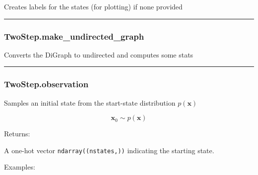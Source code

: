 \begin{Shaded}
\begin{Highlighting}[]
\NormalTok{)}
\end{Highlighting}
\end{Shaded}

Creates labels for the states (for plotting) if none provided

\begin{center}\rule{0.5\linewidth}{\linethickness}\end{center}

\subsubsection{TwoStep.make\_undirected\_graph}\label{twostep.make_undirected_graph}

\begin{Shaded}
\begin{Highlighting}[]
\NormalTok{)}
\end{Highlighting}
\end{Shaded}

Converts the DiGraph to undirected and computes some stats

\begin{center}\rule{0.5\linewidth}{\linethickness}\end{center}

\subsubsection{TwoStep.observation}\label{twostep.observation}

\begin{Shaded}
\begin{Highlighting}[]
\NormalTok{)}
\end{Highlighting}
\end{Shaded}

Samples an initial state from the start-state distribution
\(p(\mathbf x)\)

\[
\mathbf x_0 \sim p(\mathbf x)
\]

Returns:

A one-hot vector \texttt{ndarray((nstates,))} indicating the starting
state.

Examples:

\begin{Shaded}
\begin{Highlighting}[]
\OperatorTok{=}
\end{Highlighting}
\end{Shaded}

